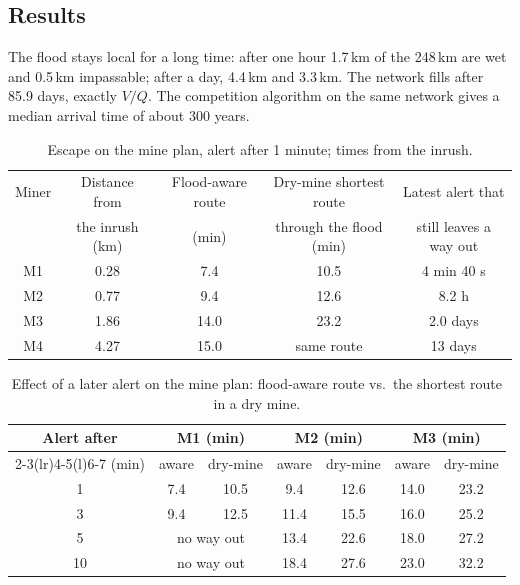 \documentclass[11pt,a4paper]{article}
\theoremstyle{remark}
\begin{document}
\subsection{Results}
The flood stays local for a long time: after one hour 1.7\,km of the 248\,km are wet and 0.5\,km impassable; after a day, 4.4\,km and 3.3\,km. The network fills after 85.9 days, exactly $V/Q$. The competition algorithm on the same network gives a median arrival time of about 300 years.

\begin{table}[htbp]
  \centering\small
  \begin{tabular}{@{}c c c c c@{}}
    \toprule
    Miner & Distance from & Flood-aware route & Dry-mine shortest route & Latest alert that\\
          & the inrush (km) & (min) & through the flood (min) & still leaves a way out\\
    \midrule
    M1 & 0.28 & 7.4  & 10.5 & 4 min 40 s\\
    M2 & 0.77 & 9.4  & 12.6 & 8.2 h\\
    M3 & 1.86 & 14.0 & 23.2 & 2.0 days\\
    M4 & 4.27 & 15.0 & same route & 13 days\\
    \bottomrule
  \end{tabular}
  \caption{Escape on the mine plan, alert after 1 minute; times from the inrush.}
  \label{tab:mine}
\end{table}

\begin{table}[htbp]
  \centering\small
  \begin{tabular}{@{}c cc cc cc@{}}
    \toprule
    Alert after & \multicolumn{2}{c}{M1 (min)} & \multicolumn{2}{c}{M2 (min)} & \multicolumn{2}{c}{M3 (min)}\\
    \cmidrule(lr){2-3}\cmidrule(lr){4-5}\cmidrule(l){6-7}
    (min) & aware & dry-mine & aware & dry-mine & aware & dry-mine\\
    \midrule
    1  & 7.4 & 10.5 & 9.4  & 12.6 & 14.0 & 23.2\\
    3  & 9.4 & 12.5 & 11.4 & 15.5 & 16.0 & 25.2\\
    5  & \multicolumn{2}{c}{no way out} & 13.4 & 22.6 & 18.0 & 27.2\\
    10 & \multicolumn{2}{c}{no way out} & 18.4 & 27.6 & 23.0 & 32.2\\
    \bottomrule
  \end{tabular}
  \caption{Effect of a later alert on the mine plan: flood-aware route vs.\ the shortest route in a dry mine.}
  \label{tab:mine-alert}
\end{table}
\end{document}
